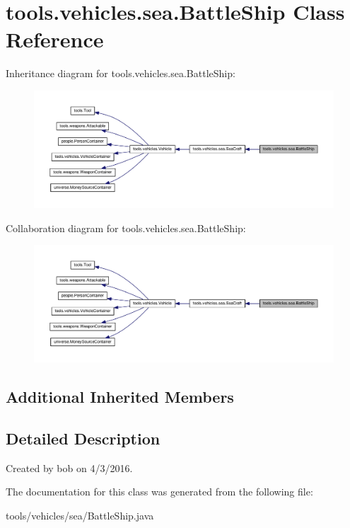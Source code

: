 \hypertarget{classtools_1_1vehicles_1_1sea_1_1_battle_ship}{}\section{tools.\+vehicles.\+sea.\+Battle\+Ship Class Reference}
\label{classtools_1_1vehicles_1_1sea_1_1_battle_ship}


Inheritance diagram for tools.\+vehicles.\+sea.\+Battle\+Ship\+:\nopagebreak
\begin{figure}[H]
\begin{center}
\leavevmode
\includegraphics[width=350pt]{classtools_1_1vehicles_1_1sea_1_1_battle_ship__inherit__graph}
\end{center}
\end{figure}


Collaboration diagram for tools.\+vehicles.\+sea.\+Battle\+Ship\+:\nopagebreak
\begin{figure}[H]
\begin{center}
\leavevmode
\includegraphics[width=350pt]{classtools_1_1vehicles_1_1sea_1_1_battle_ship__coll__graph}
\end{center}
\end{figure}
\subsection*{Additional Inherited Members}


\subsection{Detailed Description}
Created by bob on 4/3/2016. 

The documentation for this class was generated from the following file\+:\begin{DoxyCompactItemize}
\item 
tools/vehicles/sea/Battle\+Ship.\+java\end{DoxyCompactItemize}
